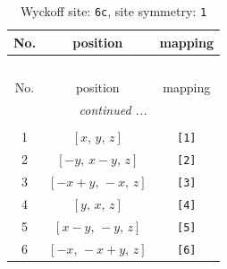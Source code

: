 \documentclass[fleqn,8pt]{jsarticle}
\begin{document}
\begin{longtable}{ccc}
\caption{Wyckoff site: {\tt 6c}, site symmetry: {\tt 1}}
 \\
 \hline \hline
No. & position & mapping \\ \hline \endfirsthead

\multicolumn{2}{l}{\tablename\ \thetable{}} \\
 \hline \hline
No. & position & mapping \\ \hline \endhead

 \hline \hline
\multicolumn{2}{r}{\footnotesize\it continued ...} \\ \endfoot

 \hline \hline
\multicolumn{2}{r}{} \\ \endlastfoot

1 & $\left[ x,\, y,\, z \right]$ & {\tt [1]} \\ \hline
2 & $\left[ - y,\, x - y,\, z \right]$ & {\tt [2]} \\ \hline
3 & $\left[ - x + y,\, - x,\, z \right]$ & {\tt [3]} \\ \hline
4 & $\left[ y,\, x,\, z \right]$ & {\tt [4]} \\ \hline
5 & $\left[ x - y,\, - y,\, z \right]$ & {\tt [5]} \\ \hline
6 & $\left[ - x,\, - x + y,\, z \right]$ & {\tt [6]} \\
\end{longtable}
\end{document}
